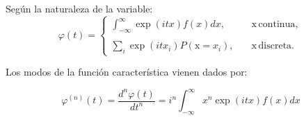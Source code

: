 \documentclass[openany]{book}
\begin{document}
Según la naturaleza de la variable:
\begin{equation}
  \label{eq:func-carac}
  \varphi(t)=\begin{cases}
    \displaystyle\int_{-\infty}^{\infty}\exp{(itx)}f(x)dx,\quad &\mathrm{x}\,\text{continua},\\
    \\
    \displaystyle\sum_{i}\exp{(itx_{i})}P(\mathrm{x}=x_{i}),\quad &\mathrm{x}\,\text{discreta}.
  \end{cases}
\end{equation}

\par Los modos de la función característica vienen dados por:

\begin{equation}
  \label{eq:modos-func-caract}
  \varphi^{(n)}(t)=\frac{d^{n}\varphi(t)}{dt^{n}}=i^{n}\int_{-\infty}^{\infty}x^{n}\exp{(itx)}f(x)dx
\end{equation}
\end{document}

